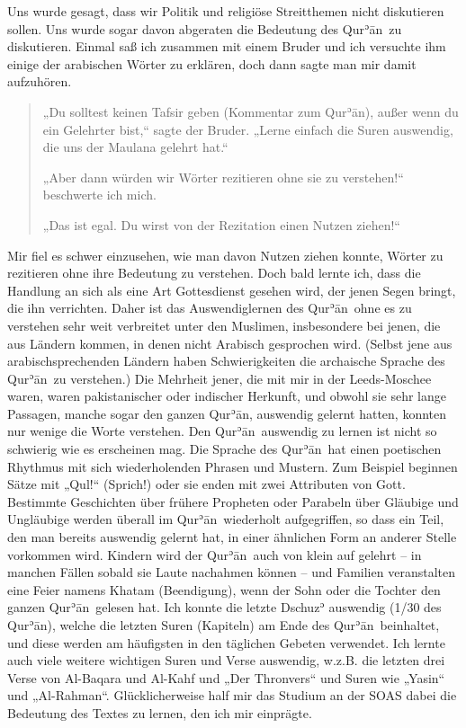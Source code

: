 \documentclass[12pt]{memoir}
\def\´{ʾ} %
\def \Quran{Qur\-\´ān} %
\begin{document}
Uns wurde gesagt, dass wir Politik und religiöse Streitthemen
nicht diskutieren sollen.
Uns wurde sogar davon abgeraten die Bedeutung des \Quran\ zu diskutieren.
Einmal saß ich zusammen mit einem Bruder und ich versuchte ihm einige
der arabischen Wörter zu erklären, doch dann sagte man mir damit aufzuhören.

\begin{quote}
„Du solltest keinen Tafsir geben (Kommentar zum \Quran),
außer wenn du ein Gelehrter bist,“ sagte der Bruder.
„Lerne einfach die Suren auswendig, die uns der Maulana gelehrt hat.“

„Aber dann würden wir Wörter rezitieren ohne sie zu verstehen!“
beschwerte ich mich.

„Das ist egal. Du wirst von der Rezitation einen Nutzen ziehen!“
\end{quote}

Mir fiel es schwer einzusehen, wie man davon Nutzen ziehen konnte,
Wörter zu rezitieren ohne ihre Bedeutung zu verstehen.
Doch bald lernte ich, dass die Handlung an sich
als eine Art Gottesdienst gesehen wird,
der jenen Segen bringt, die ihn verrichten.
Daher ist das Auswendiglernen des \Quran\ ohne es zu verstehen
sehr weit verbreitet unter den Muslimen, insbesondere bei jenen,
die aus Ländern kommen, in denen nicht Arabisch gesprochen wird.
(Selbst jene aus arabischsprechenden Ländern haben Schwierigkeiten
die archaische Sprache des \Quran\ zu verstehen.)
Die Mehrheit jener, die mit mir in der Leeds-Moschee waren,
waren pakistanischer oder indischer Herkunft,
und obwohl sie sehr lange Passagen, manche sogar den ganzen \Quran,
auswendig gelernt hatten, konnten nur wenige die Worte verstehen.
Den \Quran\ auswendig zu lernen ist nicht so schwierig wie es erscheinen mag.
Die Sprache des \Quran\ hat einen poetischen Rhythmus
mit sich wiederholenden Phrasen und Mustern.
Zum Beispiel beginnen Sätze mit „Qul!“ (Sprich!)
oder sie enden mit zwei Attributen von Gott.
Bestimmte Geschichten über frühere Propheten oder Parabeln
über Gläubige und Ungläubige werden überall im \Quran\ wiederholt aufgegriffen,
so dass ein Teil, den man  bereits auswendig gelernt hat,
in einer ähnlichen Form an anderer Stelle vorkommen wird.
Kindern wird der \Quran\ auch von klein auf gelehrt –
in manchen Fällen sobald sie Laute nachahmen können –
und Familien veranstalten eine Feier namens Khatam (Beendigung),
wenn der Sohn oder die Tochter den ganzen \Quran\ gelesen hat.
Ich konnte die letzte Dschuz\´ auswendig (1/30 des \Quran),
welche die letzten Suren (Kapiteln) am Ende des \Quran\ beinhaltet,
und diese werden am häufigsten in den täglichen Gebeten verwendet.
Ich lernte auch viele weitere wichtigen Suren und Verse auswendig,
w.z.B. die letzten drei Verse von Al-Baqara und Al-Kahf und „Der Thronvers“
und Suren wie „Yasin“ und „Al-Rahman“.
Glücklicherweise half mir das Studium an der SOAS dabei
die Bedeutung des Textes zu lernen, den ich mir einprägte.
\end{document}
